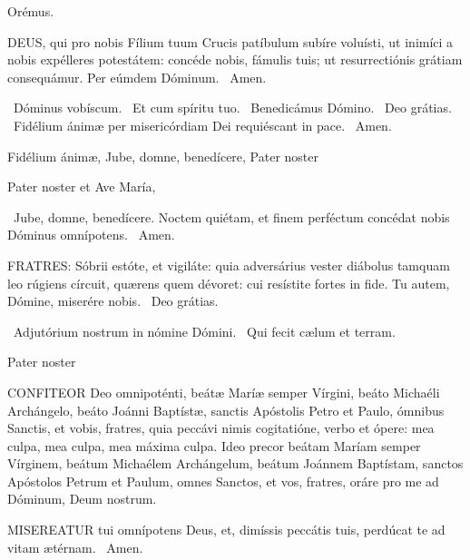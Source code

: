 Orémus. 

\lettrine[lines=2]{D}{EUS}, qui pro nobis Fílium tuum Crucis patíbulum subíre voluísti, ut inimíci a nobis expélleres potestátem: concéde nobis, fámulis tuis; ut resurrectiónis grátiam consequámur. Per eúmdem Dóminum. \R\ Amen.


\V\ Dóminus vobíscum. \R\ Et cum spíritu tuo. \V\ Benedicámus Dómino. \R\ Deo grátias. \V\ Fidélium ánimæ per misericórdiam Dei requiéscant in pace. \R\ Amen.

 Fidélium ánimæ,  Jube, domne, benedícere,  Pater noster 


 Pater noster et Ave María, 

\V\ Jube, domne, benedícere.  Noctem quiétam, et finem perféctum concédat nobis Dóminus omnípotens. \R\ Amen.


\lettrine[lines=2]{F}{RATRES}: Sóbrii estóte, et vigiláte: quia adversárius vester diábolus tamquam leo rúgiens círcuit, quærens quem dévoret: cui resístite fortes in fide. Tu autem, Dómine, miserére nobis. \R\ Deo grátias.

\V\ Adjutórium nostrum in nómine Dómini. \R\ Qui fecit cælum et terram.

Pater noster 


\lettrine[lines=2]{C}{ONFITEOR} Deo omnipoténti, beátæ Maríæ semper Vírgini, beáto Michaéli Archángelo, beáto Joánni Baptístæ, sanctis Apóstolis Petro et Paulo, ómnibus Sanctis, et vobis, fratres, quia peccávi nimis cogitatióne, verbo et ópere: mea culpa, mea culpa, mea máxima culpa. Ideo precor beátam Maríam semper Vírginem, beátum Michaélem Archángelum, beátum Joánnem Baptístam, sanctos Apóstolos Petrum et Paulum, omnes Sanctos, et vos, fratres, oráre pro me ad Dóminum, Deum nostrum.


\lettrine[lines=2]{M}{ISEREATUR} tui omnípotens Deus, et, dimíssis peccátis tuis, perdúcat te ad vitam ætérnam. \R\ Amen.


